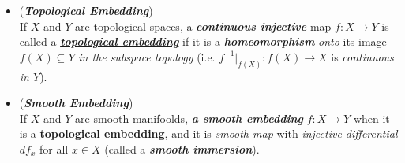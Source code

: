 \documentclass[11pt]{article}
\begin{document}
\begin{itemize}
\item \begin{definition} (\emph{\textbf{Topological Embedding}})\\
If $X$ and $Y$ are topological spaces, a \emph{\textbf{continuous injective}} map $f: X \rightarrow Y$ is called a \underline{\emph{\textbf{topological embedding}}} if it is a \emph{\textbf{homeomorphism}} \emph{onto} its image $f(X) \subseteq Y$ \emph{in the subspace topology} (i.e. $f^{-1}|_{f(X)}: f(X) \rightarrow X$ is \emph{continuous in $Y$}).
\end{definition}

\item \begin{remark}(\emph{\textbf{Smooth Embedding}})\\
If $X$ and $Y$ are smooth manifoolds, \emph{\textbf{a smooth embedding}} $f: X \rightarrow Y$ when it is a \textbf{topological embedding}, and it is \emph{smooth map} with \emph{injective differential} $df_{x}$ for all $x \in X$ (called a \emph{\textbf{smooth immersion}}).
\end{remark}
\end{itemize}
\end{document}
